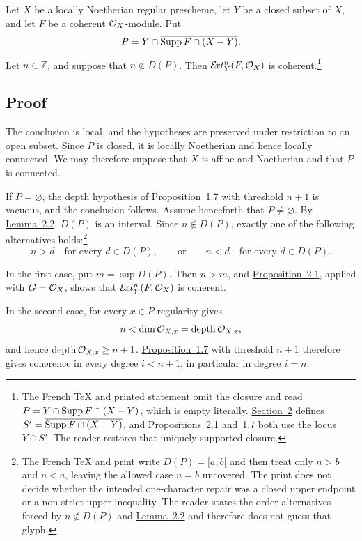Let $X$ be a locally Noetherian regular prescheme, let $Y$ be a closed subset
of $X$, and let $F$ be a coherent $\mathcal O_X$-module. Put
\[
  P=Y\cap\overline{\operatorname{Supp} F\cap(X-Y)}.
\]
Let $n\in\mathbb Z$, and suppose that $n\notin D(P)$. Then
$\mathcal E\!xt_Y^n(F,\mathcal O_X)$ is coherent.\footnote{The French TeX and printed
statement omit the closure and read
$P=Y\cap\operatorname{Supp} F\cap(X-Y)$, which is empty literally. \hyperref[VII.2]{Section~2} defines
$S'=\overline{\operatorname{Supp} F\cap(X-Y)}$, and \hyperref[VII.2.1]{Propositions~2.1} and~\hyperref[VII.1.7]{1.7} both use the
locus $Y\cap S'$. The reader restores that uniquely supported closure.}

\subsection*{Proof}

The conclusion is local, and the hypotheses are preserved under restriction
to an open subset. Since $P$ is closed, it is locally Noetherian and hence
locally connected. We may therefore suppose that $X$ is affine and Noetherian
and that $P$ is connected.

If $P=\varnothing$, the depth hypothesis of \hyperref[VII.1.7]{Proposition~1.7} with threshold
$n+1$ is vacuous, and the conclusion follows. Assume henceforth that
$P\neq\varnothing$. By \hyperref[VII.2.2]{Lemma~2.2}, $D(P)$ is an interval. Since
$n\notin D(P)$, exactly one of the following alternatives holds:\footnote{The
French TeX and print write $D(P)=[a,b[$ and then treat only $n>b$ and $n<a$,
leaving the allowed case $n=b$ uncovered. The print does not decide whether
the intended one-character repair was a closed upper endpoint or a non-strict
upper inequality. The reader states the order alternatives forced by
$n\notin D(P)$ and \hyperref[VII.2.2]{Lemma~2.2} and therefore does not guess that glyph.}
\[
  n>d\quad\text{for every }d\in D(P),
  \qquad\text{or}\qquad
  n<d\quad\text{for every }d\in D(P).
\]

In the first case, put $m=\sup D(P)$. Then $n>m$, and \hyperref[VII.2.1]{Proposition~2.1},
applied with $G=\mathcal O_X$, shows that $\mathcal E\!xt_Y^n(F,\mathcal O_X)$ is coherent.

In the second case, for every $x\in P$ regularity gives
\[
  n<\dim\mathcal O_{X,x}=\operatorname{depth}\mathcal O_{X,x},
\]
and hence $\operatorname{depth}\mathcal O_{X,x}\geq n+1$. \hyperref[VII.1.7]{Proposition~1.7} with threshold
$n+1$ therefore gives coherence in every degree $i<n+1$, in particular in
degree $i=n$.

